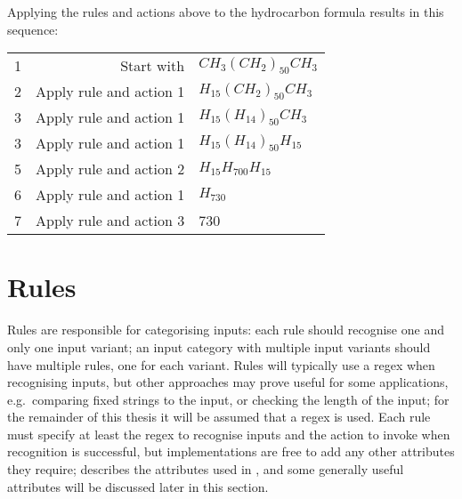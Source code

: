 Applying the rules and actions above to the hydrocarbon formula results in
this sequence:

\begin{tabular}{lrl}

    1 & Start with              & $CH_{3}{(CH_{2})}_{50}CH_{3}$ \\
    2 & Apply rule and action 1 & $H_{15}{(CH_{2})}_{50}CH_{3}$ \\
    3 & Apply rule and action 1 & $H_{15}{(H_{14})}_{50}CH_{3}$ \\
    3 & Apply rule and action 1 & $H_{15}{(H_{14})}_{50}H_{15}$ \\
    5 & Apply rule and action 2 & $H_{15}H_{700}H_{15}$ \\
    6 & Apply rule and action 1 & $H_{730}$ \\
    7 & Apply rule and action 3 & 730 \\

\end{tabular}

\section{Rules}

\label{rules in architecture}

Rules are responsible for categorising inputs: each rule should recognise
one and only one input variant; an input category with multiple input
variants should have multiple rules, one for each variant.  Rules will
typically use a regex when recognising inputs, but other approaches may
prove useful for some applications, e.g.\ comparing fixed strings to the
input, or checking the length of the input; for the remainder of this
thesis it will be assumed that a regex is used.  Each rule must specify at
least the regex to recognise inputs and the action to invoke when
recognition is successful, but implementations are free to add any other
attributes they require;  describes the
attributes used in \parsername{}, and some generally useful attributes will
be discussed later in this section.

